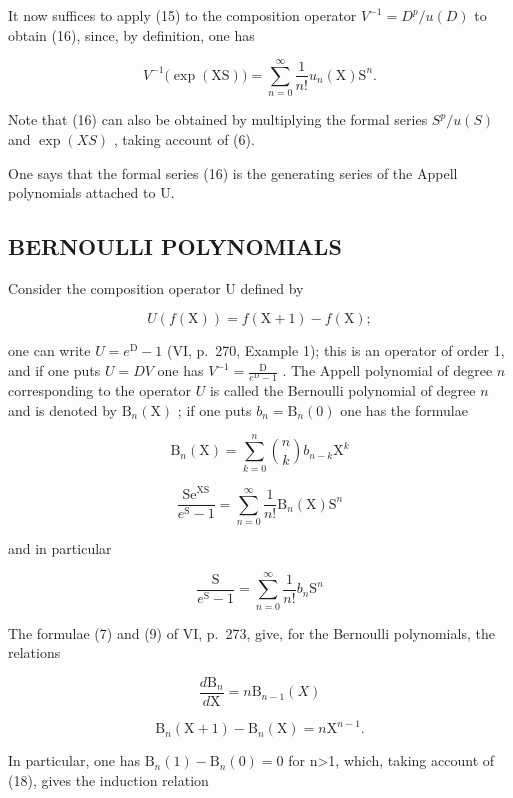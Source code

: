 It now suffices to apply (15) to the composition operator \(V^{-1} = D^{p}/u(D)\) to obtain (16), since, by definition, one has

\[
V ^ {- 1} \big (\exp (\mathrm{XS}) \big) = \sum_ {n = 0} ^ {\infty} \frac {1}{n !} u _ {n} (\mathrm{X}) \mathrm{S} ^ {n}.
\]

Note that (16) can also be obtained by multiplying the formal series \(S^{p}/u(S)\) and \(\exp(XS)\) , taking account of (6).

One says that the formal series (16) is the generating series of the Appell polynomials attached to U.

\subsection{BERNOULLI POLYNOMIALS}

Consider the composition operator U defined by

\[
U (f (\mathrm{X})) = f (\mathrm{X} + 1) - f (\mathrm{X});
\]

one can write \(U = e^{\mathrm{D}} - 1\) (VI, p.~270, Example 1); this is an operator of order 1, and if one puts \(U = DV\) one has \(V^{-1} = \frac{\mathrm{D}}{e^{\mathrm{D}} - 1}\) . The Appell polynomial of degree \(n\) corresponding to the operator \(U\) is called the Bernoulli polynomial of degree \(n\) and is denoted by \(\mathrm{B}_n(\mathrm{X})\) ; if one puts \(b_n = \mathrm{B}_n(0)\) one has the formulae

\[
\mathrm{B} _ {n} (\mathrm{X}) = \sum_ {k = 0} ^ {n} \binom{n}{k} b _ {n - k} \mathrm{X} ^ {k}\tag{18}
\]

\[
\frac {\mathrm{Se} ^ {\mathrm{XS}}}{e ^ {\mathrm{S}} - 1} = \sum_ {n = 0} ^ {\infty} \frac {1}{n !} \mathrm{B} _ {n} (\mathrm{X}) \mathrm{S} ^ {n}\tag{19}
\]

and in particular

\[
{\frac {\mathrm{S}}{e ^ {\mathrm{S}} - 1}} = \sum_ {n = 0} ^ {\infty} {\frac {1}{n !}} b _ {n} \mathrm{S} ^ {n}\tag{20}
\]

The formulae (7) and (9) of VI, p.~273, give, for the Bernoulli polynomials, the relations

\[
\frac {d \mathrm{B} _ {n}}{d \mathrm{X}} = n \mathrm{B} _ {n - 1} (X)\tag{21}
\]

\[
\mathrm{B} _ {n} (\mathrm{X} + 1) - \mathrm{B} _ {n} (\mathrm{X}) = n \mathrm{X} ^ {n - 1}.\tag{22}
\]

In particular, one has \(\mathrm{B}_{n}(1)-\mathrm{B}_{n}(0)=0\) for n\textgreater1, which, taking account of (18), gives the induction relation

